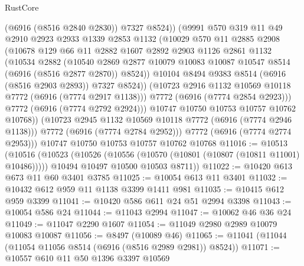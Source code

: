 \begin{lexlean}{RustCore}
\begin{coremodule}
                  (@6916 (@8516 @2840 @2830))
                  @7327
                  @8524))
              (@9991
                @570
                @319
                @11
                @49
                @2910
                @2923
                @2933
                @1339
                @2853
                @1132
                (@10029
                  @570
                  @11
                  @2885
                  @2908
                  (@10678
                    @129
                    @66
                    @11
                    @2882
                    @1607
                    @2892
                    @2903
                    @1126
                    @2861
                    @1132
                    (@10534
                      @2882
                      (@10540
                        @2869
                        @2877
                        @10079
                        @10083
                        @10087
                        @10547
                        @8514
                        (@6916 (@8516 @2877 @2870))
                        @8524))
                    @10104
                    @8494
                    @9383
                    @8514
                    (@6916 (@8516 @2903 @2893))
                    @7327
                    @8524))
                (@10723 @2916 @1132 @10569 @10118 @7772 (@6916 (@7774 @2917 @1138)))
                @7772
                (@6916 (@7774 @2854 @2923)))
              @7772
              (@6916 (@7774 @2792 @2924)))
            @10747
            @10750
            @10753
            @10757
            @10762
            @10768))
        (@10723 @2945 @1132 @10569 @10118 @7772 (@6916 (@7774 @2946 @1138)))
        @7772
        (@6916 (@7774 @2784 @2952)))
      @7772
      (@6916 (@7774 @2774 @2953)))
    @10747
    @10750
    @10753
    @10757
    @10762
    @10768
@11016 := @10513
    (@10516
      (@10523
        (@10526 (@10556 (@10570 (@10801 (@10807 (@10811 @11001) @10486)))))
        @10494
        @10497
        @10500
        @10503
        @8711))
@11022 := @10420 @613 @673 @11 @60 @3401 @3785
@11025 := @10054 @613 @11 @3401
@11032 := @10432 @612 @959 @11 @1138 @3399 @1411 @981
@11035 := @10415 @612 @959 @3399
@11041 := @10420 @586 @611 @24 @51 @2994 @3398
@11043 := @10054 @586 @24
@11044 := @11043 @2994
@11047 := @10062 @46 @36 @24
@11049 := @11047 @2290 @1607
@11054 := @11049 @2980 @2989 @10079 @10083 @10087
@11056 := @8497 (@10089 @46)
@11065 := @11041 (@11044 (@11054 @11056 @8514 (@6916 (@8516 @2989 @2981)) @8524))
@11071 := @10557 @610 @11 @50 @1396 @3397 @10569

\end{coremodule}
\end{lexlean}
